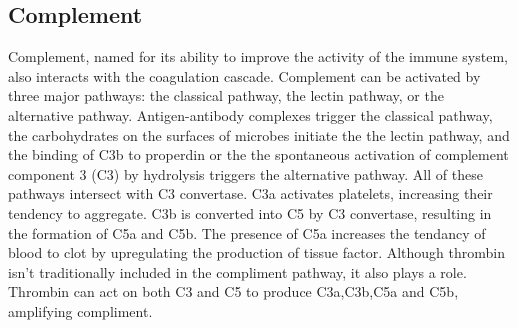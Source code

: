 \documentclass[12pt]{article}
\begin{document}
\subsection*{Complement}
Complement, named for its ability to improve the activity of the immune system, also interacts with the coagulation cascade. Complement can be activated by three major pathways: the classical pathway, the lectin pathway, or the alternative pathway. \citep{oikonomopoulou2012interactions} Antigen-antibody complexes trigger the classical pathway, the carbohydrates on the surfaces of microbes initiate the the lectin pathway, and the binding of C3b to properdin or the the spontaneous activation of complement component 3 (C3) by hydrolysis triggers the alternative pathway. All of these pathways intersect with C3 convertase. \citep{markiewski2007complement} 
C3a activates platelets, increasing their tendency to aggregate. C3b is converted into C5 by C3 convertase, resulting in the formation of C5a and C5b. The presence of C5a increases the tendancy of blood to clot by upregulating the production of tissue factor. Although thrombin isn't traditionally included in the compliment pathway, it also plays a role. Thrombin can act on both C3 and C5 to produce C3a,C3b,C5a and C5b, amplifying compliment. \citep{oikonomopoulou2012interactions}
\end{document}
